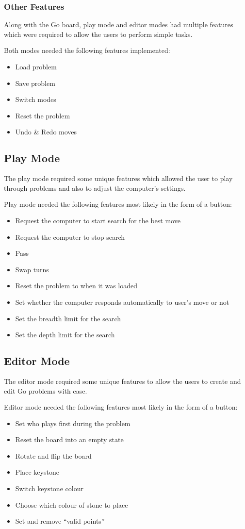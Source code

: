 \documentclass{l4proj}
\begin{document}
\subsubsection{Other Features}
Along with the Go board, play mode and editor modes had multiple features which were required to allow the users to perform simple tasks.

Both modes needed the following features implemented:
\begin{itemize}
\item Load problem
\item Save problem
\item Switch modes
\item Reset the problem
\item Undo \& Redo moves
\end{itemize}

\subsection{Play Mode}
The play mode required some unique features which allowed the user to play through problems and also to adjust the computer’s settings.

Play mode needed the following features most likely in the form of a button:
\begin{itemize}
\item Request the computer to start search for the best move
\item Request the computer to stop search
\item Pass
\item Swap turns
\item Reset the problem to when it was loaded
\item Set whether the computer responds automatically to user’s move or not
\item Set the breadth limit for the search
\item Set the depth limit for the search
\end{itemize}

\subsection{Editor Mode}
The editor mode required some unique features to allow the users to create and edit  Go problems with ease.

Editor mode needed the following features most likely in the form of a button:
\begin{itemize}
\item Set who plays first during the problem
\item Reset the board into an empty state
\item Rotate and flip the board
\item Place keystone
\item Switch keystone colour
\item Choose which colour of stone to place
\item Set and remove “valid points”
\end{itemize}
\end{document}
